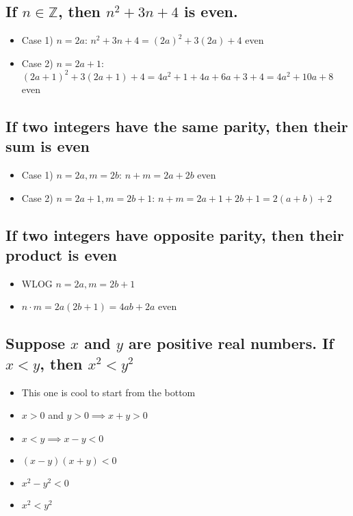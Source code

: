 \documentclass[11pt, oneside]{amsart}
\begin{document}
\subsection{If \(n \in \mathbb{Z}\), then \(n^2+3n+4\) is even.}
\label{sec:orgd0a4a05}
\begin{itemize}
\item Case 1) \(n=2a\): \(n^2+3n+4 = (2a)^2+3(2a)+4\) even
\item Case 2) \(n=2a+1\): \((2a+1)^2+3(2a+1)+4 = 4a^2+1+4a+6a+3+4 = 4a^2+10a+8\) even
\end{itemize}

\subsection{If two integers have the same parity, then their sum is even}
\label{sec:orgdb671b0}
\begin{itemize}
\item Case 1) \(n=2a, m=2b\): \(n+m = 2a+2b\) even
\item Case 2) \(n=2a+1, m=2b+1\): \(n+m = 2a+1+2b+1 = 2(a+b)+2\)
\end{itemize}

\subsection{If two integers have opposite parity, then their product is even}
\label{sec:org7767278}
\begin{itemize}
\item WLOG \(n=2a, m=2b+1\)
\item \(n \cdot m = 2a(2b+1) = 4ab+2a\) even
\end{itemize}

\subsection{Suppose \(x\) and \(y\) are positive real numbers.  If \(x<y\), then \(x^2<y^2\)}
\label{sec:org9239d5c}
\begin{itemize}
\item This one is cool to start from the bottom
\item \(x>0\) and \(y>0 \implies x+y>0\)
\item \(x<y \implies x-y<0\)
\item \((x-y)(x+y)<0\)
\item \(x^2-y^2<0\)
\item \(x^2<y^2\)
\end{itemize}
\end{document}
